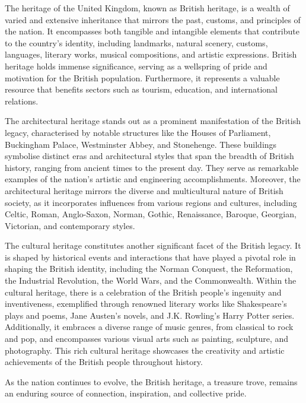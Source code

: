\documentclass[12pt,a4paper,twoside]{article}
\newenvironment{readingpassage}[1][]{%
    \begin{tcolorbox}[enhanced, colback=grayLight, colframe=secondaryBlue,
        coltitle=textDark, fonttitle=\bfseries, title={#1},
        rounded corners, arc=3mm, boxrule=1pt,
        left=15pt, right=15pt, top=10pt, bottom=10pt,
        breakable, before skip=10pt, after skip=10pt, drop fuzzy shadow]
    \setstretch{1.3}
}{\end{tcolorbox}}
\begin{document}
\begin{readingpassage}[]
The heritage of the United Kingdom, known as British heritage, is a wealth of varied and extensive inheritance that mirrors the past, customs, and principles of the nation. It encompasses both tangible and intangible elements that contribute to the country's identity, including landmarks, natural scenery, customs, languages, literary works, musical compositions, and artistic expressions. British heritage holds immense significance, serving as a wellspring of pride and motivation for the British population. Furthermore, it represents a valuable resource that benefits sectors such as tourism, education, and international relations.

The architectural heritage stands out as a prominent manifestation of the British legacy, characterised by notable structures like the Houses of Parliament, Buckingham Palace, Westminster Abbey, and Stonehenge. These buildings symbolise distinct eras and architectural styles that span the breadth of British history, ranging from ancient times to the present day. They serve as remarkable examples of the nation's artistic and engineering accomplishments. Moreover, the architectural heritage mirrors the diverse and multicultural nature of British society, as it incorporates influences from various regions and cultures, including Celtic, Roman, Anglo-Saxon, Norman, Gothic, Renaissance, Baroque, Georgian, Victorian, and contemporary styles.

The cultural heritage constitutes another significant facet of the British legacy. It is shaped by historical events and interactions that have played a pivotal role in shaping the British identity, including the Norman Conquest, the Reformation, the Industrial Revolution, the World Wars, and the Commonwealth. Within the cultural heritage, there is a celebration of the British people's ingenuity and inventiveness, exemplified through renowned literary works like Shakespeare's plays and poems, Jane Austen's novels, and J.K. Rowling's Harry Potter series. Additionally, it embraces a diverse range of music genres, from classical to rock and pop, and encompasses various visual arts such as painting, sculpture, and photography. This rich cultural heritage showcases the creativity and artistic achievements of the British people throughout history.

As the nation continues to evolve, the British heritage, a treasure trove, remains an enduring source of connection, inspiration, and collective pride.
\end{readingpassage}
\end{document}
